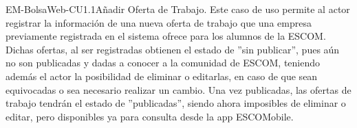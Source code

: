 	\begin{UseCase}{EM-BolsaWeb-CU1.1}{Añadir Oferta de Trabajo.}{
		\noindent
		Este caso de uso permite al actor registrar la información de una nueva oferta de trabajo que una empresa previamente registrada en el sistema ofrece para los alumnos de la ESCOM. Dichas ofertas, al ser registradas obtienen el estado de ''sin publicar'', pues aún no son publicadas y dadas a conocer a la comunidad de ESCOM, teniendo además el actor la posibilidad de eliminar o editarlas, en caso de que sean equivocadas o sea necesario realizar un cambio. Una vez publicadas, las ofertas de trabajo tendrán el estado de ''publicadas'', siendo ahora imposibles de eliminar o editar, pero disponibles ya para consulta desde la app ESCOMobile. 
		\newline
		}
\end{UseCase}
